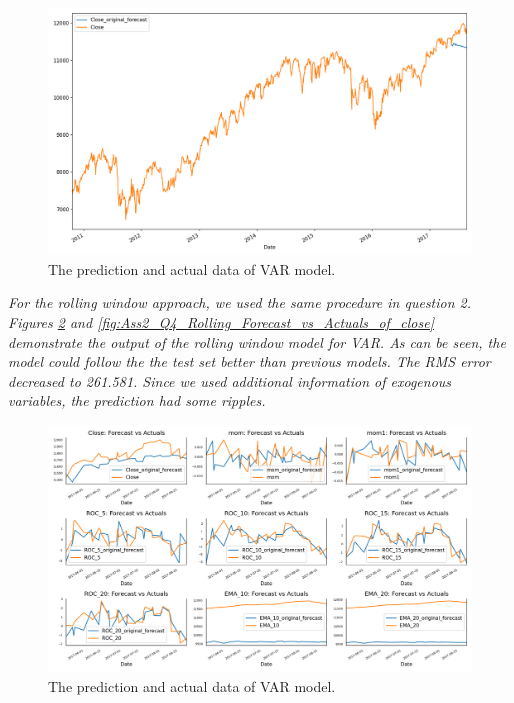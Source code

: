 \begin{figure}[H]
    \centering
    \begin{minipage}[b]{1\textwidth}
        \includegraphics[width=\textwidth]{manuscript/src/figures/Ass2/Ass2_Q4_Forecast_vs_Actuals_of_close.png}
    \end{minipage}
    \caption{The prediction and actual data of VAR model.}
    \label{fig:Ass2_Q4_Forecast_vs_Actuals_of_close}
\end{figure}




\textit{For the rolling window approach, we used the same procedure in question 2. Figures \ref{fig:Ass2_Q4_Rolling_Forecast_vs_Actuals} and \ref{fig:Ass2_Q4_Rolling_Forecast_vs_Actuals_of_close} demonstrate the output of the rolling window model for VAR. As can be seen, the model could follow the the test set better than previous models. The RMS error decreased to 261.581. Since we used additional information of exogenous variables, the prediction had some ripples.}

\begin{figure}[H]
    \centering
    \begin{minipage}[b]{1\textwidth}
        \includegraphics[width=\textwidth]{manuscript/src/figures/Ass2/Ass2_Q4_Rolling_Forecast_vs_Actuals.png}
    \end{minipage}
    \caption{The prediction and actual data of VAR model.}
    \label{fig:Ass2_Q4_Rolling_Forecast_vs_Actuals}
\end{figure}

